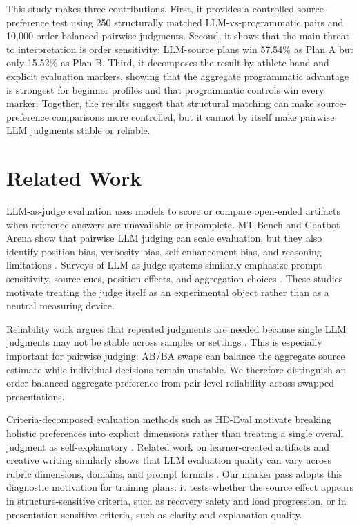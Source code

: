 \documentclass[11pt]{article}
\begin{document}
This study makes three contributions. First, it provides a controlled source-preference test using 250 structurally matched LLM-vs-programmatic pairs and 10,000 order-balanced pairwise judgments. Second, it shows that the main threat to interpretation is order sensitivity: LLM-source plans win 57.54\% as Plan A but only 15.52\% as Plan B. Third, it decomposes the result by athlete band and explicit evaluation markers, showing that the aggregate programmatic advantage is strongest for beginner profiles and that programmatic controls win every marker. Together, the results suggest that structural matching can make source-preference comparisons more controlled, but it cannot by itself make pairwise LLM judgments stable or reliable.

\section{Related Work}

LLM-as-judge evaluation uses models to score or compare open-ended artifacts when reference answers are unavailable or incomplete. MT-Bench and Chatbot Arena show that pairwise LLM judging can scale evaluation, but they also identify position bias, verbosity bias, self-enhancement bias, and reasoning limitations \citep{zheng2023llmasajudge}. Surveys of LLM-as-judge systems similarly emphasize prompt sensitivity, source cues, position effects, and aggregation choices \citep{gu2024language}. These studies motivate treating the judge itself as an experimental object rather than as a neutral measuring device.

Reliability work argues that repeated judgments are needed because single LLM judgments may not be stable across samples or settings \citep{schroeder2025trustllmjudgmentsreliability}. This is especially important for pairwise judging: AB/BA swaps can balance the aggregate source estimate while individual decisions remain unstable. We therefore distinguish an order-balanced aggregate preference from pair-level reliability across swapped presentations.

Criteria-decomposed evaluation methods such as HD-Eval motivate breaking holistic preferences into explicit dimensions rather than treating a single overall judgment as self-explanatory \citep{liu2024hdevalaligninglargelanguage}. Related work on learner-created artifacts and creative writing similarly shows that LLM evaluation quality can vary across rubric dimensions, domains, and prompt formats \citep{tian2024evaluating,kim2025llms}. Our marker pass adopts this diagnostic motivation for training plans: it tests whether the source effect appears in structure-sensitive criteria, such as recovery safety and load progression, or in presentation-sensitive criteria, such as clarity and explanation quality.
\end{document}
